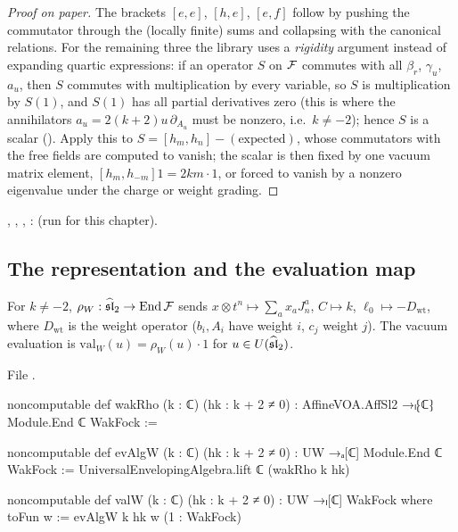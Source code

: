 \begin{proof}[Proof on paper]
The brackets $[e,e]$, $[h,e]$, $[e,f]$ follow by pushing the commutator through the (locally finite)
sums and collapsing with the canonical relations. For the remaining three the library uses a
\emph{rigidity} argument instead of expanding quartic expressions: if an operator $S$ on $\mathcal{F}$
commutes with all $\beta_r$, $\gamma_u$, $a_u$, then $S$ commutes with multiplication by every variable,
so $S$ is multiplication by $S(1)$, and $S(1)$ has all partial derivatives zero (this is where the
annihilators $a_u = 2(k+2)u\,\partial_{A_u}$ must be nonzero, i.e.\ $k\ne-2$); hence $S$ is a scalar
(\allowbreak{}\allowbreak{}\allowbreak{}\allowbreak{}\allowbreak{}). Apply this to $S = [h_m,h_n] - (\text{expected})$, whose
commutators with the free fields are computed to vanish; the scalar is then fixed by one vacuum
matrix element, $[h_m,h_{-m}]1 = 2km\cdot1$, or forced to vanish by a nonzero eigenvalue under the
charge or weight grading.
\end{proof}

\begin{status}
, , , :
\lean{[propext, Classical.}\allowbreak{}\allowbreak\lean{sound]} (run for this chapter).
\end{status}

\subsection{The representation and the evaluation map}

\begin{definition}\label{l08:def:wakrho}
For $k\ne-2$, $\rho_W : \widehat{\mathfrak{sl}}_2\to\operatorname{End}\mathcal{F}$ sends $x\otimes t^n\mapsto\sum_ax_aJ^a_n$,
$C\mapsto k$, $\ell_0\mapsto-D_{\mathrm{wt}}$, where $D_{\mathrm{wt}}$ is the weight operator ($b_i, A_i$
have weight $i$, $c_j$ weight $j$). The vacuum evaluation is $\mathrm{val}_W(u) = \rho_W(u)\cdot1$ for
$u\in U(\widehat{\mathfrak{sl}}_2)$.
\end{definition}

\noindent File .
\begin{leancode}
noncomputable def wakRho (k : ℂ) (hk : k + 2 ≠ 0) :
    AffineVOA.AffSl2 →ₗ⁅ℂ⁆ Module.End ℂ WakFock :=

noncomputable def evAlgW (k : ℂ) (hk : k + 2 ≠ 0) : UW →ₐ[ℂ] Module.End ℂ WakFock :=
  UniversalEnvelopingAlgebra.lift ℂ (wakRho k hk)

noncomputable def valW (k : ℂ) (hk : k + 2 ≠ 0) : UW →ₗ[ℂ] WakFock where
  toFun w := evAlgW k hk w (1 : WakFock)
\end{leancode}


